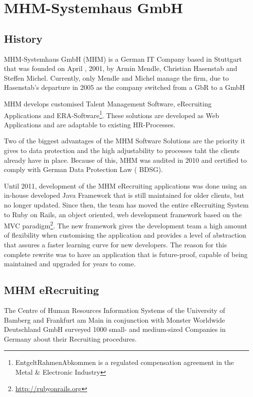 \chapter{MHM-Systemhaus GmbH}\label{ch:mhm}

\section{History}
MHM-Systemhaus GmbH (MHM) is a German IT Company based in Stuttgart that was founded on April , 2001, by Armin Mendle, Christian Hasenstab and Steffen Michel. Currently, only Mendle and Michel manage the firm, due to Hasenstab's departure in 2005 as the company switched from a GbR to a GmbH

MHM develops customised Talent Management Software, eRecruiting Applications and ERA-Software\footnote{EntgeltRahmenAbkommen is a regulated compensation agreement in the Metal \& Electronic Industry}. These solutions are developed as Web Applications and are adaptable to existing HR-Processes.

Two of the biggest advantages of the MHM Software Solutions are the priority it gives to data protection and the high adjustability to processes taht the clients already have in place. Because of this, MHM was audited in 2010 and certified to comply with German Data Protection Law ( BDSG).\cite{michel:2012}

Until 2011, development of the MHM eRecruiting applications was done using an in-house developed Java Framework that is still maintained for older clients, but no longer updated. Since then, the team has moved the entire eRecruiting System to Ruby on Rails, an object oriented, web development framework based on the \ac{MVC} paradigm\footnote{\url{http://rubyonrails.org}}. The new framework gives the development team a high amount of flexibility when customising the application and provides a level of abstraction that assures a faster learning curve for new developers. The reason for this complete rewrite was to have an application that is future-proof, capable of being maintained and upgraded for years to come.

\section{MHM eRecruiting}
The Centre of Human Resources Information Systems of the University of Bamberg and Frankfurt am Main in conjunction with Monster Worldwide Deutschland GmbH surveyed 1000 small- and medium-sized Companies in Germany about their Recruiting procedures.\cite[p. 6]{weitzel:2012}

